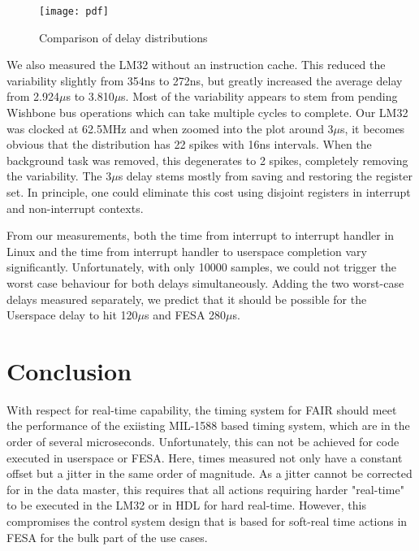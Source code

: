 \documentclass{JAC2003}
\begin{document}
\begin{figure}[t]
   \centering
   \texttt{[image: pdf]}
   \caption{Comparison of delay distributions}
\end{figure}

We also measured the LM32 without an instruction cache.
This reduced the variability slightly from 354ns to 272ns, 
but greatly increased the average delay from 2.924$\mu$s to 3.810$\mu$s.
Most of the variability appears to stem from pending Wishbone bus operations which
can take multiple cycles to complete.
Our LM32 was clocked at 62.5MHz and when zoomed into the plot around 3$\mu$s,
it becomes obvious that the distribution has 22 spikes with 16ns intervals.
When the background task was removed, 
this degenerates to 2 spikes, 
completely removing the variability.
The 3$\mu$s delay stems mostly from saving and restoring the register set.
In principle, one could eliminate this cost using disjoint registers 
in interrupt and non-interrupt contexts.

From our measurements,
both the time from interrupt to interrupt handler in Linux 
and the time from interrupt handler to userspace completion vary significantly.
Unfortunately, with only 10000 samples, 
we could not trigger the worst case behaviour for both delays simultaneously.
Adding the two worst-case delays measured separately,
we predict that it should be possible for the Userspace delay to hit
120$\mu$s and FESA 280$\mu$s.

\section{Conclusion}
With respect for real-time capability,  the timing system for FAIR should meet the performance of the exiisting MIL-1588 based timing system, which are in the order of several microseconds. Unfortunately,
this can not be achieved for code executed in userspace or FESA. Here, times measured not only have a constant offset but a jitter in the same order of magnitude. As a jitter cannot be corrected for in the data master, this requires that all actions requiring harder "real-time" to be executed in the LM32 or in HDL for hard real-time. However, this compromises the control system design that is based for soft-real time actions in FESA for the bulk part of the use cases.
\end{document}
